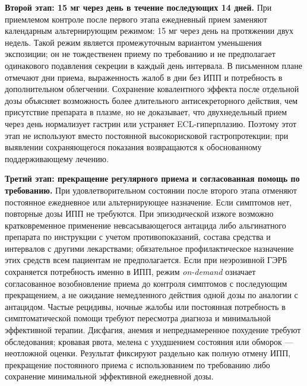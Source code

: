 \documentclass[11pt,a4paper,notitlepage]{report}
\newcommand{\src}[1]{\unskip\space\cite{#1}}
\begin{document}
\textbf{Второй этап: 15 мг через день в течение последующих 14 дней.} При приемлемом контроле после первого этапа ежедневный прием заменяют календарным альтернирующим режимом: 15 мг через день на протяжении двух недель. Такой режим является промежуточным вариантом уменьшения экспозиции; он не тождественен приему по требованию и не предполагает одинакового подавления секреции в каждый день интервала. В письменном плане отмечают дни приема, выраженность жалоб в дни без ИПП и потребность в дополнительном облегчении.\src{withdrawfarrell2017,molrestore} Сохранение ковалентного эффекта после отдельной дозы объясняет возможность более длительного антисекреторного действия, чем присутствие препарата в плазме, но не доказывает, что двухнедельный прием через день нормализует гастрин или устраняет ECL-гиперплазию. Поэтому этот этап не используют вместо постоянной высокорисковой гастропротекции; при выявлении сохраняющегося показания возвращаются к обоснованному поддерживающему лечению.\src{molrestore,agadepres}

\textbf{Третий этап: прекращение регулярного приема и согласованная помощь по требованию.} При удовлетворительном состоянии после второго этапа отменяют постоянное ежедневное или альтернирующее назначение. Если симптомов нет, повторные дозы ИПП не требуются. При эпизодической изжоге возможно кратковременное применение невсасывающегося антацида либо альгинатного препарата по инструкции с учетом противопоказаний, состава средства и интервалов с другими лекарствами; обязательное профилактическое назначение этих средств всем пациентам не предполагается.\src{nice} Если при неэрозивной ГЭРБ сохраняется потребность именно в ИПП, режим \textit{on-demand} означает согласованное возобновление приема до контроля симптомов с последующим прекращением, а не ожидание немедленного действия одной дозы по аналогии с антацидом.\src{acggerd,withdrawfarrell2017} Частые рецидивы, ночные жалобы или постоянная потребность в симптоматической помощи требуют пересмотра диагноза и минимальной эффективной терапии. Дисфагия, анемия и непреднамеренное похудение требуют обследования; кровавая рвота, мелена с ухудшением состояния или обморок --- неотложной оценки. Результат фиксируют раздельно как полную отмену ИПП, прекращение постоянного приема с использованием по требованию либо сохранение минимальной эффективной ежедневной дозы.\src{acggerd,withdrawfarrell2017}
\end{document}
